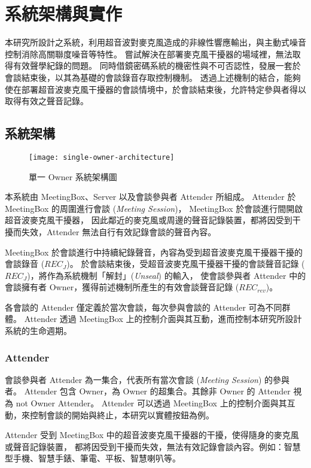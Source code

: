 \chapter{系統架構與實作}

    本研究所設計之系統，利用超音波對麥克風造成的非線性響應輸出，與主動式噪音控制消除高關聯度噪音等特性。
嘗試解決在部署麥克風干擾器的場域裡，無法取得有效聲學紀錄的問題。
同時借鏡密碼系統的機密性與不可否認性，發展一套於會談結束後，以其為基礎的會談錄音存取控制機制。
透過上述機制的結合，能夠使在部署超音波麥克風干擾器的會談情境中，於會談結束後，允許特定參與者得以取得有效之聲音記錄。


\section{系統架構}

\begin{figure}[H]
    \centering
    \texttt{[image: single-owner-architecture]}
    \caption{單一 Owner 系統架構圖}
    \label{fig.s-o-arch}
\end{figure}

    本系統由 MeetingBox、Server 以及會談參與者 Attender 所組成。
Attender 於 MeetingBox 的周圍進行會談 ({\it Meeting Session})，
MeetingBox 於會談進行間開啟超音波麥克風干擾器，
因此鄰近的麥克風或周邊的聲音記錄裝置，都將因受到干擾而失效，Attender 無法自行有效記錄會談的聲音內容。

    MeetingBox 於會談進行中持續紀錄聲音，內容為受到超音波麥克風干擾器干擾的會談錄音 ($REC_{J}$)。
於會談結束後，受超音波麥克風干擾器干擾的會談聲音記錄 ($REC_{J}$)，將作為系統機制「解封」({\it Unseal}) 的輸入，
使會談參與者 Attender 中的會談擁有者 Owner，獲得前述機制所產生的有效會談聲音記錄 ($REC_{rev}$)。

    各會談的 Attender 僅定義於當次會談，每次參與會談的 Attender 可為不同群體。
Attender 透過 MeetingBox 上的控制介面與其互動，進而控制本研究所設計系統的生命週期。


\subsection{Attender}

    會談參與者 Attender 為一集合，代表所有當次會談 ({\it Meeting Session}) 的參與者。
Attender 包含 Owner，為 Owner 的超集合。其餘非 Owner 的 Attender 視為 not Owner Attender。
Attender 可以透過 MeetingBox 上的控制介面與其互動，來控制會談的開始與終止，本研究以實體按鈕為例。

    Attender 受到 MeetingBox 中的超音波麥克風干擾器的干擾，使得隨身的麥克風或聲音記錄裝置，
都將因受到干擾而失效，無法有效記錄會談內容。例如：智慧型手機、智慧手錶、筆電、平板、智慧喇叭等。


